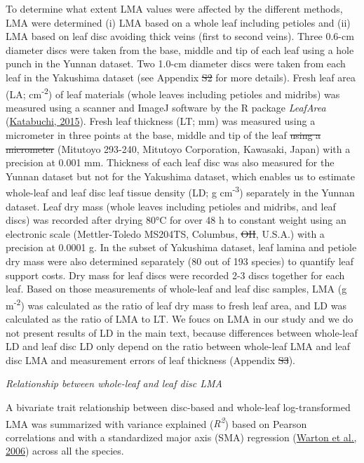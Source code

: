 \documentclass[
  12pt,
  a4paper,
,tablecaptionabove
]{scrartcl}
\providecommand{\DIFaddtex}[1]{{\protect\color{blue}\uwave{#1}}} %
\providecommand{\DIFdeltex}[1]{{\protect\color{red}\sout{#1}}}                      %
\providecommand{\DIFaddbegin}{} %
\providecommand{\DIFaddend}{} %
\providecommand{\DIFdelbegin}{} %
\providecommand{\DIFdelend}{} %
\providecommand{\DIFadd}[1]{\texorpdfstring{\DIFaddtex{#1}}{#1}} %
\providecommand{\DIFdel}[1]{\texorpdfstring{\DIFdeltex{#1}}{}} %
\begin{document}
To determine what extent LMA values were affected by the different methods, LMA were determined (i) LMA based on a whole leaf including petioles and (ii) LMA based on leaf disc avoiding thick veins (first to second veins).
Three 0.6-cm diameter discs were taken from the base, middle and tip of each leaf using a hole punch in the Yunnan dataset.
Two 1.0-cm diameter discs were taken from each leaf in the Yakushima dataset (see Appendix \DIFdelbegin \DIFdel{S2 }\DIFdelend \DIFaddbegin \DIFadd{S1, Figure S1 }\DIFaddend for more details).
Fresh leaf area (LA; cm\textsuperscript{-2}) of leaf materials (whole leaves including petioles and midribs) was measured using a scanner and ImageJ software by the R package \emph{LeafArea} (\protect\hyperlink{ref-Katabuchi2015}{Katabuchi, 2015}).
Fresh leaf thickness (LT; mm) was measured using a micrometer in three points at the base, middle and tip of the leaf \DIFdelbegin \DIFdel{using a micrometer }\DIFdelend (Mitutoyo 293-240, Mitutoyo Corporation, Kawasaki, Japan) with a precision at 0.001 mm.
Thickness of each leaf disc was also measured for the Yunnan dataset but not for the Yakushima dataset, which enables us to estimate whole-leaf and leaf disc leaf tissue density (LD; g cm\textsuperscript{-3}) separately in the Yunnan dataset.
Leaf dry mass (whole leaves including petioles and midribs, and leaf discs) was recorded after drying 80°C for over 48 h to constant weight using an electronic scale (Mettler-Toledo MS204TS, Columbus, \DIFdelbegin \DIFdel{OH}\DIFdelend \DIFaddbegin \DIFadd{Ohio}\DIFaddend , U.S.A.) with a precision at 0.0001 g.
In the subset of Yakushima dataset, leaf lamina and petiole dry mass were also determined separately (80 out of 193 species) to quantify leaf support costs.
Dry mass for leaf discs were recorded 2-3 discs together for each leaf.
Based on those measurements of whole-leaf and leaf disc samples, LMA (g m\textsuperscript{-2}) was calculated as the ratio of leaf dry mass to fresh leaf area, and LD was calculated as the ratio of LMA to LT.
We foucs on LMA in our study and we do not present results of LD in the main text, because differences between whole-leaf LD and leaf disc LD only depend on the ratio between whole-leaf LMA and leaf disc LMA and measurement errors of leaf thickness (Appendix \DIFdelbegin \DIFdel{S3}\DIFdelend \DIFaddbegin \DIFadd{S1, Figure S2}\DIFaddend ).

\emph{Relationship between whole-leaf and leaf disc LMA}

A bivariate trait relationship between disc-based and whole-leaf log-transformed LMA was summarized with variance explained (\emph{R\textsuperscript{2}}) based on Pearson correlations and with a standardized major axis (SMA) regression (\protect\hyperlink{ref-Warton2006}{Warton et al., 2006}) across all the species.
\end{document}
